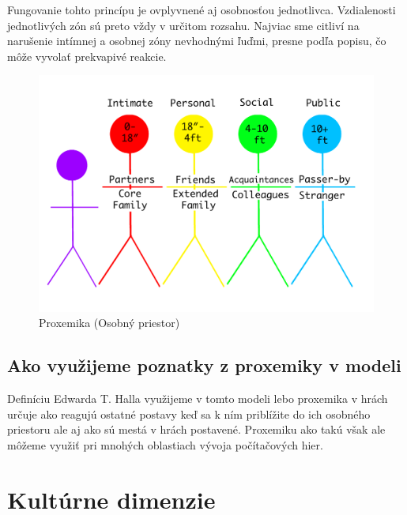 \documentclass[10pt,twoside,slovak,a4paper]{article}
\begin{document}
Fungovanie tohto princípu je ovplyvnené aj osobnosťou jednotlivca. Vzdialenosti jednotlivých
zón sú preto vždy v určitom rozsahu. Najviac sme citliví na narušenie intímnej a osobnej zóny
nevhodnými ľuďmi, presne podľa popisu, čo môže vyvolať prekvapivé reakcie.

\begin{figure}[H]
	\centering
	\includegraphics[scale=0.34]{Obrázky/Proxemics.png}
	\caption{Proxemika (Osobný priestor)}
	\label{fig:proxemics}
\end{figure}


\subsection{Ako využijeme poznatky z proxemiky v modeli}\label{proxemika:poznatky}

Definíciu Edwarda T. Halla využijeme v tomto modeli lebo proxemika v hrách určuje ako reagujú
ostatné postavy keď sa k ním priblížite do ich osobného priestoru ale aj ako sú mestá v hrách
postavené. Proxemiku ako takú však ale môžeme využiť pri mnohých oblastiach vývoja počítačových
hier.

\pagebreak

\section{Kultúrne dimenzie}\label{kultura} 
\end{document}
